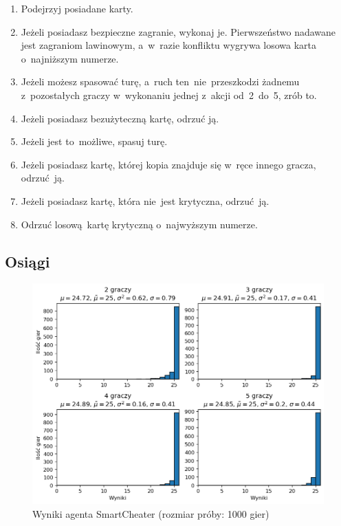 \documentclass[declaration,shortabstract,inz]{iithesis}
\begin{document}
\begin{enumerate}
	\item Podejrzyj posiadane karty.
	\item Jeżeli posiadasz bezpieczne zagranie, wykonaj je. Pierwszeństwo nadawane jest zagraniom lawinowym, a~w~razie konfliktu wygrywa losowa karta o~najniższym numerze.
	\item Jeżeli możesz spasować turę, a~ruch ten~nie~przeszkodzi żadnemu z~pozostałych graczy w~wykonaniu jednej z~akcji od~2~do~5, zrób to.
	\item Jeżeli posiadasz bezużyteczną kartę, odrzuć ją.
	\item Jeżeli jest to~możliwe, spasuj turę.
	\item Jeżeli posiadasz kartę, której kopia znajduje się w~ręce innego gracza, odrzuć ją.
	\item Jeżeli posiadasz kartę, która nie~jest krytyczna, odrzuć ją.
	\item Odrzuć losową kartę krytyczną o~najwyższym numerze.
\end{enumerate}

\subsection*{Osiągi}

\begin{figure}[H]
	\centering
	\captionsetup{format=hang}
	\includegraphics[width=\textwidth,height=\textheight,keepaspectratio]{SmartCheater.png}
	\caption[Caption]{Wyniki agenta SmartCheater (rozmiar próby: 1000 gier)}
	\label{fig:SmartCheater}
\end{figure}
\end{document}
